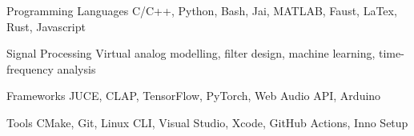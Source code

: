 

\begin{cvskills}

    \cvskill
    {Programming Languages} %
    {C/C++, Python, Bash, Jai, MATLAB, Faust, LaTex, Rust, Javascript} %

    \cvskill
    {Signal Processing} %
    {Virtual analog modelling, filter design, machine learning, time-frequency analysis} %

    \cvskill
    {Frameworks} %
    {JUCE, CLAP, TensorFlow, PyTorch, Web Audio API, Arduino} %

    \cvskill
    {Tools} %
    {CMake, Git, Linux CLI, Visual Studio, Xcode, GitHub Actions, Inno Setup} %

\end{cvskills}
